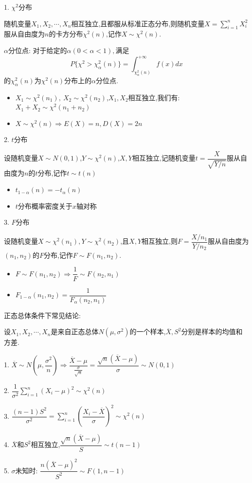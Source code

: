 \begin{definition}[三大分布]
	1. $\chi^2$分布
	
	随机变量$X_{1},X_{2},\cdots,X_{n}$相互独立,且都服从标准正态分布,则随机变量$X=\sum\limits_{i=1}^{n}X_{i}^2$服从自由度为$n$的卡方分布$\chi^2(n)$,记作$X\sim \chi^2(n)$.
	
	$\alpha$分位点: $\text{对于给定的}\alpha(0<\alpha<1),\text{满足}$
	$$P\{\chi^2>\chi_{\alpha}^2(n)\}=\int_{\chi_{\alpha}^2(n)}^{+\infty}f(x)dx$$
	的$\chi_{\alpha}^2(n)$为$\chi^2(n)$分布上的$\alpha$分位点.
	\begin{itemize}
		\item $X_{1}\sim \chi^2(n_{1}),\ X_{2}\sim \chi^2(n_{2})$,$X_{1},X_{2}$相互独立,我们有: $X_{1}+X_{2}\sim \chi^2(n_{1}+n_{2})$
		\item $X\sim \chi^2(n)\Rightarrow E(X)=n,D(X)=2n$
	\end{itemize}
	2. $t$分布
	
	设随机变量$X\sim N(0,1)$,$Y\sim \chi^2(n)$,$X,Y$相互独立,记随机变量$t=\dfrac{X}{\sqrt{Y/n}}$服从自由度为$n$的$t$分布,记作$t\sim t(n)$
	
	\begin{itemize}
		\item $t_{1-\alpha}(n)=-t_{\alpha}(n)$
		\item $t$分布概率密度关于$x$轴对称
	\end{itemize}
	
	3. $F$分布
	
	设随机变量$X\sim \chi^2(n_{1}),Y\sim \chi^2(n_{2})$,且$X,Y$相互独立,则$F=\dfrac{X/n_{1}}{Y/n_{2}}$服从自由度为$(n_{1},n_{2})$的$F$分布,记作$F\sim F(n_{1},n_{2})$.
	
	\begin{itemize}
		\item $F\sim F(n_{1},n_{2})\Rightarrow \dfrac{1}{F}\sim F(n_{2},n_{1})$
		\item $F_{1-\alpha}(n_{1},n_{2})=\dfrac{1}{F_{\alpha}(n_{2},n_{1})}$
	\end{itemize}
\end{definition}
\begin{anymark}[注]
	正态总体条件下常见结论: 
	
	设$X_{1},X_{2},\cdots,X_{n}$是来自正态总体$N(\mu,\sigma^2)$的一个样本,$\overline{X},S^2$分别是样本的均值和方差.
	
	1. $\overline{X}\sim N(\mu,\dfrac{\sigma^2}{n})\Rightarrow \dfrac{\overline{X}-\mu}{\frac{\sigma}{\sqrt{n}}}=\dfrac{\sqrt{n}(\overline{X}-\mu)}{\sigma}\sim N(0,1)$
	
	2. $\dfrac{1}{\sigma^2}\sum\limits_{i=1}^{n}(X_{i}-\mu)^2\sim \chi^2(n)$
	
	3. $\dfrac{(n-1)S^2}{\sigma^2}=\sum\limits_{i=1}^{n}(\dfrac{X_{i}-\overline{X}}{\sigma})^2\sim \chi^2(n)$
	
	4. $\overline{X}$和$S^2$相互独立,$\dfrac{\sqrt{n}(\overline{X}-\mu)}{S}\sim t(n-1)$
	
	5. $\sigma\text{未知时}$: $\dfrac{n(\overline{X}-\mu)^2}{S^2}\sim F(1,n-1)$
\end{anymark}
